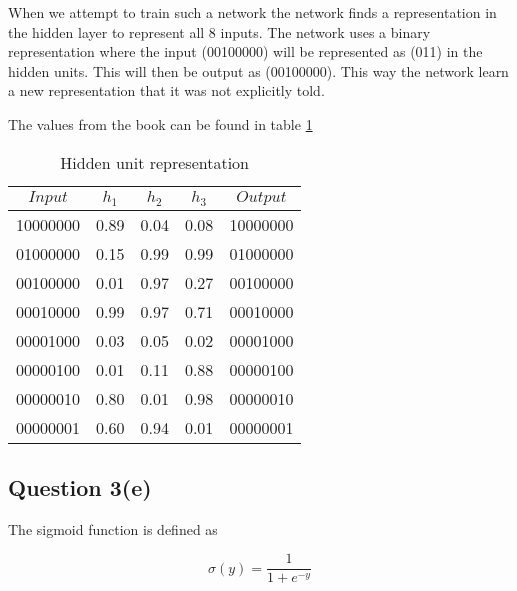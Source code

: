 \documentclass[10pt,a4paper]{article}
\begin{document}
When we attempt to train such a network the network finds a representation in the hidden layer to represent all 8 inputs. The network uses a binary representation where the input (00100000) will be represented as (011) in the hidden units. This will then be output as (00100000). This way the network learn a new representation that it was not explicitly told.

The values from the book can be found in table \ref{table2}

\begin{table}
\begin{tabular}{|c|c|c|c|c||}
\hline
$Input$ & $h_1$ & $h_2$ & $h_3$ & $Output$ \\
\hline
10000000 & 0.89 & 0.04 & 0.08 & 10000000 \\
01000000 & 0.15 & 0.99 & 0.99 & 01000000 \\
00100000 & 0.01 & 0.97 & 0.27 & 00100000 \\
00010000 & 0.99 & 0.97 & 0.71 & 00010000 \\
00001000 & 0.03 & 0.05 & 0.02 & 00001000 \\
00000100 & 0.01 & 0.11 & 0.88 & 00000100 \\
00000010 & 0.80 & 0.01 & 0.98 & 00000010 \\
00000001 & 0.60 & 0.94 & 0.01 & 00000001 \\
\hline
\end{tabular}
\caption{Hidden unit representation}\label{table2}
\end{table}

\subsection{Question 3(e)}

The sigmoid function is defined as

\begin{equation}
\sigma(y) = \frac{1}{1+e^{-y}}
\end{equation}


\end{document}
